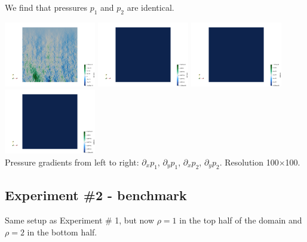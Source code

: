 We find that pressures $p_1$ and $p_2$ are identical.
\begin{center}
\includegraphics[width=4cm]{python_codes/fieldstone_119/results/exp1/dp1dx}
\includegraphics[width=4cm]{python_codes/fieldstone_119/results/exp1/dp1dy}
\includegraphics[width=4cm]{python_codes/fieldstone_119/results/exp1/dp2dx}
\includegraphics[width=4cm]{python_codes/fieldstone_119/results/exp1/dp2dy}\\
{\captionfont 
Pressure gradients from left to right: $\partial_xp_1$, $\partial_yp_1$, $\partial_xp_2$, $\partial_yp_2$. 
Resolution 100$\times$100.}
\end{center}

\subsection*{Experiment \#2 - benchmark}

Same setup as Experiment \# 1, but now $\rho=1$ in the top half of the domain and $\rho=2$ in the bottom half.

